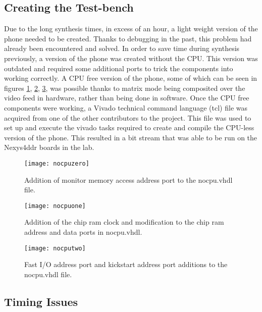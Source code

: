 \subsection{Creating the Test-bench}

\label{Ch5 Sec1 Sub1}

Due to the long synthesis times, in excess of an hour, a light weight version of the phone needed to be created. Thanks to debugging in the past, this problem had already been encountered and solved. In order to save time during synthesis previously, a version of the phone was created without the CPU. This version was outdated and required some additional ports to trick the components into working correctly. A CPU free version of the phone, some of which can be seen in figures \ref{fig:nocpuzero}, \ref{fig:nocpuone}, \ref{fig:nocputwo}, was possible thanks to matrix mode being composited over the video feed in hardware, rather than being done in software. Once the CPU free components were working, a Vivado technical command language (tcl) file was acquired from one of the other contributors to the project. This file was used to set up and execute the vivado tasks required to create and compile the CPU-less version of the phone. This resulted in a bit stream that was able to be run on the Nexys4ddr boards in the lab.

\begin{figure}
  \centering
  \texttt{[image: nocpuzero]}
  \caption{Addition of monitor memory access address port to the nocpu.vhdl file.}
  \label{fig:nocpuzero}
\end{figure}

\begin{figure}
  \centering
  \texttt{[image: nocpuone]}
  \caption{Addition of the chip ram clock and modification to the chip ram address and data ports in nocpu.vhdl.}
  \label{fig:nocpuone}
\end{figure}

\begin{figure}
  \centering
  \texttt{[image: nocputwo]}
  \caption{Fast I/O address port and kickstart address port additions to the nocpu.vhdl file.}
  \label{fig:nocputwo}
\end{figure}

\subsection{Timing Issues}

